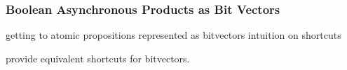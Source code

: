 




\subsubsection{Boolean Asynchronous Products as Bit Vectors}
getting to atomic propositions represented as bitvectors
intuition on shortcuts


provide equivalent shortcuts for bitvectors.




